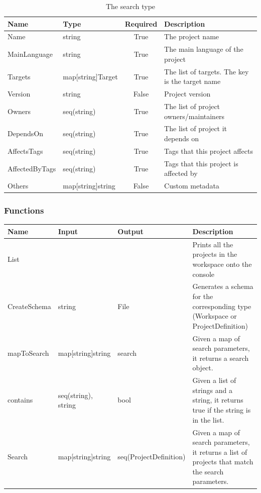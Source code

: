 \documentclass[11pt]{article}
\begin{document}
\begin{table}[h!]
  \centering
  \begin{tabular}[h!]{l | l | c | l}
    \textbf{Name} & \textbf{Type} & \textbf{Required} & \textbf{Description}\\
    \hline
    Name & string & True & The project name\\
    \hline
    MainLanguage & string & True & The main language of the project\\
    \hline
    Targets & map[string]Target & True & The list of \glspl{target}. The key is
                                         the target name\\
    \hline
    Version & string & False & Project version\\
    \hline
    Owners & seq(string) & True & The list of project owners/maintainers\\
    \hline
    DependsOn & seq(string) & True & The list of project it depends on\\
    \hline
    AffectsTags & seq(string) & True & Tags that this project affects\\
    \hline
    AffectedByTags & seq(string) & True & Tags that this project is affected by\\
    \hline
    Others & map[string]string & False & Custom metadata\\
  \end{tabular}
  \caption{The search type}
  \label{table:search}
\end{table}

\subsubsection{Functions}
\begin{tabular}{l | l | l | p{7cm} }
  \textbf{Name} & \textbf{Input} & \textbf{Output} & \textbf{Description} \\
  \hline
  List &  &  & Prints all the projects in the workspace onto the console \\
  \hline
  CreateSchema & string & File & Generates a schema for the corresponding type (Workspace or ProjectDefinition)\\
  \hline
  mapToSearch & map[string]string & search & Given a map of search parameters, it returns a search object.\\
  \hline
  contains & seq(string), string & bool & Given a list of strings and a string, it returns true if the string is in the list.\\
  \hline
  Search & map[string]string & seq(ProjectDefinition) & Given a map of search parameters, it returns a list of projects that match the search parameters.\\
\end{tabular}
\end{document}
